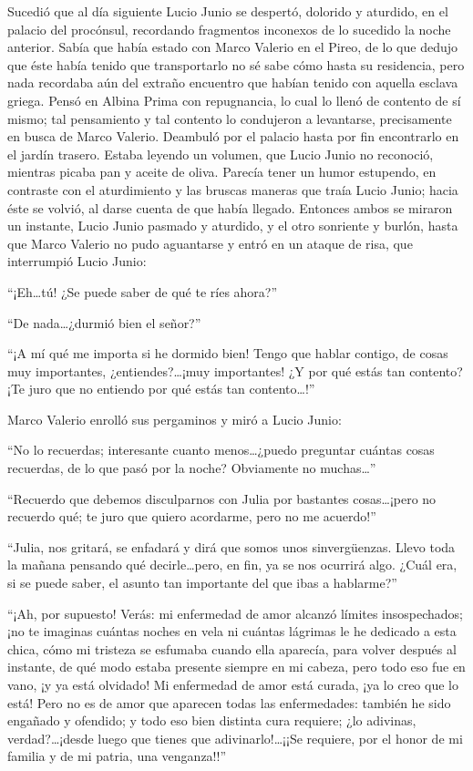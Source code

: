 \documentclass[11pt,openany]{book}
\begin{document}
Sucedió que al día siguiente Lucio Junio se despertó, dolorido y aturdido, en el palacio del procónsul, recordando fragmentos inconexos de lo sucedido la noche anterior. Sabía que había estado con Marco Valerio en el Pireo, de lo que dedujo que éste había tenido que transportarlo no sé sabe cómo hasta su residencia, pero nada recordaba aún del extraño encuentro que habían tenido con aquella esclava griega. Pensó en Albina Prima con repugnancia, lo cual lo llenó de contento de sí mismo; tal pensamiento y tal contento lo condujeron a levantarse, precisamente en busca de Marco Valerio. Deambuló por el palacio hasta por fin encontrarlo en el jardín trasero. Estaba leyendo un volumen, que Lucio Junio no reconoció, mientras picaba pan y aceite de oliva. Parecía tener un humor estupendo, en contraste con el aturdimiento y las bruscas maneras que traía Lucio Junio; hacia éste se volvió, al darse cuenta de que había llegado. Entonces ambos se miraron un instante, Lucio Junio pasmado y aturdido, y el otro sonriente y burlón, hasta que Marco Valerio no pudo aguantarse y entró en un ataque de risa, que interrumpió Lucio Junio: 

“¡Eh\dots tú! ¿Se puede saber de qué te ríes ahora?” 

“De nada\dots ¿durmió bien el señor?” 

“¡A mí qué me importa si he dormido bien! Tengo que hablar contigo, de cosas muy importantes, ¿entiendes?\dots ¡muy importantes! ¿Y por qué estás tan contento? ¡Te juro que no entiendo por qué estás tan contento\dots!” 

Marco Valerio enrolló sus pergaminos y miró a Lucio Junio: 

“No lo recuerdas; interesante cuanto menos\dots ¿puedo preguntar cuántas cosas recuerdas, de lo que pasó por la noche? Obviamente no muchas\dots” 

“Recuerdo que debemos disculparnos con Julia por bastantes cosas\dots ¡pero no recuerdo qué; te juro que quiero acordarme, pero no me acuerdo!” 

“Julia, nos gritará, se enfadará y dirá que somos unos sinvergüenzas. Llevo toda la mañana pensando qué decirle\dots pero, en fin, ya se nos ocurrirá algo. ¿Cuál era, si se puede saber, el asunto tan importante del que ibas a hablarme?” 

“¡Ah, por supuesto! Verás: mi enfermedad de amor alcanzó límites insospechados; ¡no te imaginas cuántas noches en vela ni cuántas lágrimas le he dedicado a esta chica, cómo mi tristeza se esfumaba cuando ella aparecía, para volver después al instante, de qué modo estaba presente siempre en mi cabeza, pero todo eso fue en vano, ¡y ya está olvidado! Mi enfermedad de amor está curada, ¡ya lo creo que lo está! Pero no es de amor que aparecen todas las enfermedades: también he sido engañado y ofendido; y todo eso bien distinta cura requiere; ¿lo adivinas, verdad?\dots ¡desde luego que tienes que adivinarlo!\dots¡¡Se requiere, por el honor de mi familia y de mi patria, una venganza!!” 
\end{document}
